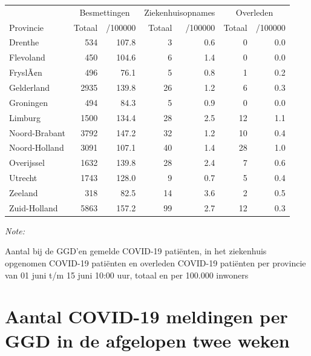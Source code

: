 \documentclass[
  english,
  man,floatsintext]{apa6}
\begin{document}
\begin{table}
\centering
\begin{threeparttable}
\begin{tabular}{lrrrrrr}
\toprule
\multicolumn{1}{c}{ } & \multicolumn{2}{c}{Besmettingen} & \multicolumn{2}{c}{Ziekenhuisopnames} & \multicolumn{2}{c}{Overleden} \\
\cmidrule(l{3pt}r{3pt}){2-3} \cmidrule(l{3pt}r{3pt}){4-5} \cmidrule(l{3pt}r{3pt}){6-7}
Provincie & Totaal & /100000 & Totaal & /100000 & Totaal & /100000\\
\midrule
Drenthe & 534 & 107.8 & 3 & 0.6 & 0 & 0.0\\
Flevoland & 450 & 104.6 & 6 & 1.4 & 0 & 0.0\\
FryslÃ¢n & 496 & 76.1 & 5 & 0.8 & 1 & 0.2\\
Gelderland & 2935 & 139.8 & 26 & 1.2 & 6 & 0.3\\
Groningen & 494 & 84.3 & 5 & 0.9 & 0 & 0.0\\
Limburg & 1500 & 134.4 & 28 & 2.5 & 12 & 1.1\\
Noord-Brabant & 3792 & 147.2 & 32 & 1.2 & 10 & 0.4\\
Noord-Holland & 3091 & 107.1 & 40 & 1.4 & 28 & 1.0\\
Overijssel & 1632 & 139.8 & 28 & 2.4 & 7 & 0.6\\
Utrecht & 1743 & 128.0 & 9 & 0.7 & 5 & 0.4\\
Zeeland & 318 & 82.5 & 14 & 3.6 & 2 & 0.5\\
Zuid-Holland & 5863 & 157.2 & 99 & 2.7 & 12 & 0.3\\
\bottomrule
\end{tabular}
\begin{tablenotes}
\item \textit{Note: } 
\item Aantal bij de GGD’en gemelde COVID-19 patiënten, in het ziekenhuis opgenomen COVID-19 patiënten en overleden COVID-19 patiënten per provincie van 01 juni t/m 15 juni 10:00 uur, totaal en per 100.000 inwoners
\end{tablenotes}
\end{threeparttable}
\end{table}

\newpage

\hypertarget{aantal-covid-19-meldingen-per-ggd-in-de-afgelopen-twee-weken}{%
\section{Aantal COVID-19 meldingen per GGD in de afgelopen twee weken}\label{aantal-covid-19-meldingen-per-ggd-in-de-afgelopen-twee-weken}}
\end{document}
